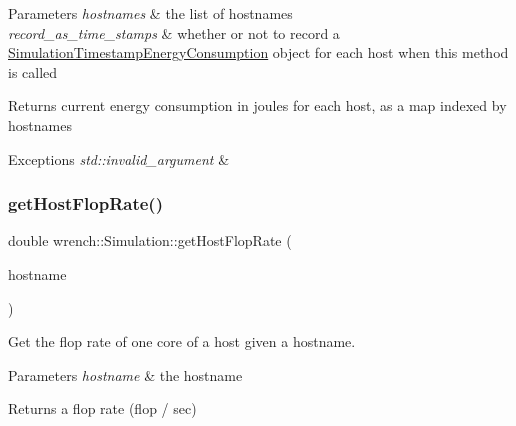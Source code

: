 \begin{DoxyParams}{Parameters}
{\em hostnames} & the list of hostnames \\
\hline
{\em record\+\_\+as\+\_\+time\+\_\+stamps} & whether or not to record a \hyperlink{classwrench_1_1_simulation_timestamp_energy_consumption}{Simulation\+Timestamp\+Energy\+Consumption} object for each host when this method is called \\
\hline
\end{DoxyParams}
\begin{DoxyReturn}{Returns}
current energy consumption in joules for each host, as a map indexed by hostnames 
\end{DoxyReturn}

\begin{DoxyExceptions}{Exceptions}
{\em std\+::invalid\+\_\+argument} & \\
\hline
\end{DoxyExceptions}
\mbox{\label{classwrench_1_1_simulation_a736b72b8fb5343f93d3a461f85f221ef}} 
\subsubsection{\texorpdfstring{get\+Host\+Flop\+Rate()}{getHostFlopRate()}}
{\footnotesize\ttfamily double wrench\+::\+Simulation\+::get\+Host\+Flop\+Rate (\begin{DoxyParamCaption}\item[{std\+::string}]{hostname }\end{DoxyParamCaption})\hspace{0.3cm}{\ttfamily [static]}}



Get the flop rate of one core of a host given a hostname. 


\begin{DoxyParams}{Parameters}
{\em hostname} & the hostname \\
\hline
\end{DoxyParams}
\begin{DoxyReturn}{Returns}
a flop rate (flop / sec) 
\end{DoxyReturn}
\mbox{\label{classwrench_1_1_simulation_a757dde71d164a89ff52e49c4c52af0b5}} 
